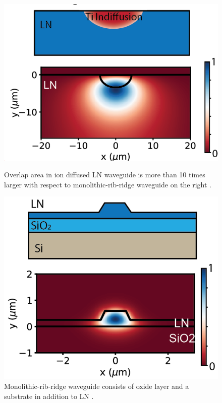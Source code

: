 \documentclass[thesis]{deutez}
\begin{document}
    \begin{figure}[htbp]
        \centering
        \begin{minipage}{0.4\textwidth}
            \centering
            \includegraphics[width=\linewidth]{ion-diffused.png}
            
            \caption{Overlap area in ion diffused LN waveguide is more than 10 times larger with respect to monolithic-rib-ridge waveguide on the right  \cite{1}.}
            \label{fig:ion_diffused_LN_wg}
        \end{minipage}
        \hspace{1.5cm}
        \begin{minipage}{0.4\textwidth}
            \centering
            \includegraphics[width=1\linewidth]{monolithic-rid-ridge.png}
            \caption{Monolithic-rib-ridge waveguide consists of oxide layer and a substrate in addition to LN \cite{1}.}
            \label{fig:rib-ridge_LN_wg}
        \end{minipage}
    \end{figure}
\end{document}
